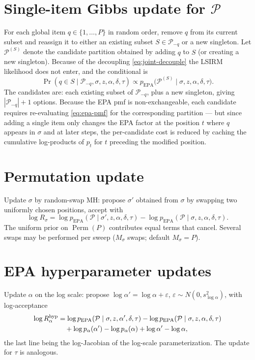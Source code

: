 \documentclass[11pt]{article}
\DeclareMathOperator{\EPA}{EPA}
\DeclareMathOperator{\Perm}{Perm}
\begin{document}
\section{Single-item Gibbs update for $\mathcal{P}$}

For each global item $q\in\{1,\dots,P\}$ in random order, remove $q$ from its
current subset and reassign it to either an existing subset
$S\in\mathcal{P}_{-q}$ or a new singleton.  Let $\mathcal{P}^{(S)}$ denote
the candidate partition obtained by adding $q$ to $S$ (or creating a new
singleton).  Because of the decoupling \eqref{eq:joint-decouple} the LSIRM
likelihood does not enter, and the conditional is
\begin{equation}
    \Pr(q\in S\mid\mathcal{P}_{-q},\sigma,z,\alpha,\delta,\tau)
    \propto p_{\EPA}\bigl(\mathcal{P}^{(S)}\mid\sigma,z,\alpha,\delta,\tau\bigr).
    \label{eq:single-item-gibbs}
\end{equation}
The candidates are: each existing subset of $\mathcal{P}_{-q}$, plus a new
singleton, giving $|\mathcal{P}_{-q}|+1$ options.  Because the EPA pmf is
non-exchangeable, each candidate requires re-evaluating
\eqref{eq:epa-pmf} for the corresponding partition --- but since adding a
single item only changes the EPA factor at the position $t$ where $q$ appears
in $\sigma$ and at later steps, the per-candidate cost is reduced by caching
the cumulative log-products of $p_t$ for $t$ preceding the modified position.

\section{Permutation update}

Update $\sigma$ by random-swap MH: propose $\sigma'$ obtained from $\sigma$
by swapping two uniformly chosen positions, accept with
\begin{equation}
    \log R_\sigma
    =\log p_{\EPA}(\mathcal{P}\mid\sigma',z,\alpha,\delta,\tau)
    -\log p_{\EPA}(\mathcal{P}\mid\sigma,z,\alpha,\delta,\tau).
    \label{eq:sigma-mh-ratio}
\end{equation}
The uniform prior on $\Perm(P)$ contributes equal terms that cancel.  Several
swaps may be performed per sweep ($M_\sigma$ swaps; default $M_\sigma=P$).

\section{EPA hyperparameter updates}

Update $\alpha$ on the log scale: propose $\log\alpha'=\log\alpha+\varepsilon$,
$\varepsilon\sim N(0,s_{\log\alpha}^2)$, with log-acceptance
\begin{align}
    \log R_\alpha^{\mathrm{hyp}}
    &=\log p_{\EPA}(\mathcal{P}\mid\sigma,z,\alpha',\delta,\tau)
    -\log p_{\EPA}(\mathcal{P}\mid\sigma,z,\alpha,\delta,\tau)
    \notag\\
    &\quad+\log p_\alpha(\alpha')-\log p_\alpha(\alpha)
    +\log\alpha'-\log\alpha,
    \label{eq:alpha-hyp-mh-ratio}
\end{align}
the last line being the log-Jacobian of the log-scale parameterization.  The
update for $\tau$ is analogous.
\end{document}
